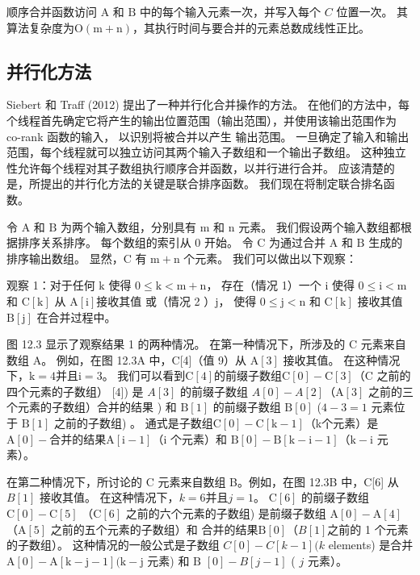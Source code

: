 顺序合并函数访问 $\mathrm{A}$ 和 $\mathrm{B}$ 中的每个输入元素一次，并写入每个 $C$ 位置一次。 
其算法复杂度为$\mathrm{O}(\mathrm{m}+\mathrm{n})$，其执行时间与要合并的元素总数成线性正比。

\subsection{并行化方法}
Siebert 和 Traff (2012) 提出了一种并行化合并操作的方法。 
在他们的方法中，每个线程首先确定它将产生的输出位置范围（输出范围），并使用该输出范围作为 co-rank 函数的输入，
以识别将被合并以产生 输出范围。 一旦确定了输入和输出范围，每个线程就可以独立访问其两个输入子数组和一个输出子数组。 
这种独立性允许每个线程对其子数组执行顺序合并函数，以并行进行合并。 
应该清楚的是，所提出的并行化方法的关键是联合排序函数。 我们现在将制定联合排名函数。

令 $\mathrm{A}$ 和 $\mathrm{B}$ 为两个输入数组，分别具有 $\mathrm{m}$ 和 $\mathrm{n}$ 元素。 
我们假设两个输入数组都根据排序关系排序。 每个数组的索引从 0 开始。 
令 $\mathrm{C}$ 为通过合并 $\mathrm{A}$ 和 $\mathrm{B}$ 生成的排序输出数组。 
显然，$\mathrm{C}$ 有 $\mathrm{m}+\mathrm{n}$ 个元素。 我们可以做出以下观察：

观察 1：对于任何 $\mathrm{k}$ 使得 $0 \leq \mathrm{k}<\mathrm{m}+\mathrm{n}$，
存在（情况 1）一个 $\mathrm{i} $ 使得 $0 \leq \mathrm{i}<\mathrm{m}$ 和 $\mathrm{C}[\mathrm{k}]$ 从 $\mathrm{A}[\mathrm{i}] 接收其值 $ 或（情况 2 ）$\mathrm{j}$，
使得 $0 \leq \mathrm{j}<\mathrm{n}$ 和 $\mathrm{C}[\mathrm{k}]$ 接收其值 $\mathrm{B}[\mathrm{j}]$ 在合并过程中。

图 12.3 显示了观察结果 1 的两种情况。 在第一种情况下，所涉及的 $\mathrm{C}$ 元素来自数组 A。
例如，在图 12.3A 中，C[4]（值 9）从 $\mathrm{A}[3]$ 接收其值。 
在这种情况下，$\mathrm{k}=4$并且$\mathrm{i}=3$。 
我们可以看到$\mathrm{C}[4]$的前缀子数组$\mathrm{C}[0]-\mathrm{C}[3]$（$\mathrm{C}$ 之前的四个元素的子数组） [4]) 是 $A[3]$ 的前缀子数组 $A[0]-A[2]$（$\mathrm{A}[3]$ 之前的三个元素的子数组）合并的结果 ) 和 $\mathrm{B}[1]$ 的前缀子数组 $\mathrm{B}[0]$ ($4-3=1$ 元素位于 $\mathrm{B}[1]$ 之前的子数组) 。 
通式是子数组$\mathrm{C}[0]-\mathrm{C}[\mathrm{k}-1]$（k个元素）是$\mathrm{A}[0]-合并的结果 \mathrm{A}[\mathrm{i}-1]$（i 个元素）和 $\mathrm{B}[0]-\mathrm{B}[\mathrm{k}-\mathrm{i}-1] （\mathrm{k}-\mathrm{i}$ 元素）。

在第二种情况下，所讨论的 $\mathrm{C}$ 元素来自数组 B。例如，在图 12.3B 中，C[6] 从 $B[1]$ 接收其值。 
在这种情况下，$k=6$并且$j=1$。 $\mathrm{C}[6]$ 的前缀子数组 $\mathrm{C}[0]-\mathrm{C}[5]$ （$\mathrm{C}[6]$ 之前的六个元素的子数组) 是前缀子数组 $\mathrm{A}[0]-\mathrm{A}[4]$ （$\mathrm{A}[5]$ 之前的五个元素的子数组）和 合并的结果$\mathrm{B}[0]$（$B[1]$之前的 1 个元素的子数组）。 
这种情况的一般公式是子数组 $C[0]-C[k-1](k$ elements) 是合并 $\mathrm{A}[0]-\mathrm{A}[\mathrm{ k}-\mathrm{j}-1](\mathrm{k}-\mathrm{j}$ 元素) 和 $\mathrm{B}$ $[0]-B[j-1]$ ( $j$ 元素）。

